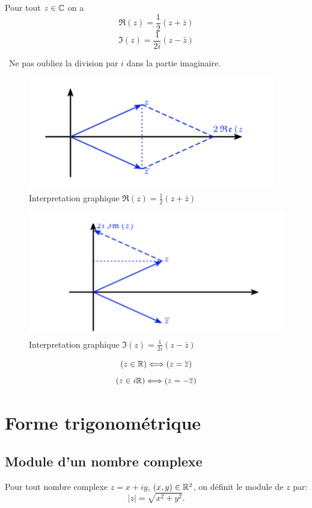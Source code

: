 \documentclass[a4paper, 11pt]{article}
\begin{document}
\begin{prop}
 Pour tout $z \in \mathbb{C}$ on a 
$$\Re(z) = \frac{1}{2} (z+\bar{z})$$
$$\Im(z) = \frac{1}{2i} (z-\bar{z})$$
\end{prop}
\warning \, Ne pas oubliez la division par $i$ dans la partie imaginaire. 
\begin{figure}[h]
\centering
\includegraphics[scale=0.8]{images/reel}
\vspace{-0.4cm}
\caption{Interpretation graphique $\Re(z) = \frac{1}{2} (z+\bar{z})$}
\end{figure}


\begin{figure}[h]
\centering
\includegraphics[scale=0.8]{images/imag}
\vspace{-0.4cm}
\caption{Interpretation graphique $\Im(z) = \frac{1}{2i} (z-\bar{z})$ }
\end{figure}

\begin{prop}
$$(z\in \mathbb{R}) \Longleftrightarrow (z=\overline{z})$$ 
$$(z\in i\mathbb{R}) \Longleftrightarrow (z=-\overline{z})$$ 
\end{prop}





\section{Forme trigonométrique}

\subsection{Module d'un nombre complexe}
\begin{defi}
Pour tout nombre complexe $z=x+iy$,  $(x,y)\in \mathbb{R}^2$, on définit le module de $z$ par:
$$|z| = \sqrt{x^2+y^2}.$$
\end{defi}
\end{document}

